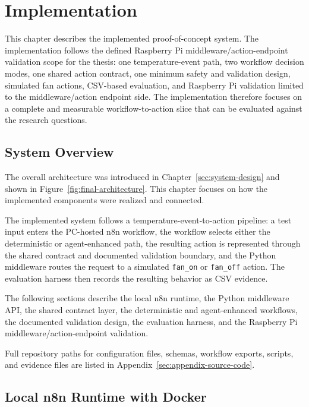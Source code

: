 \section{Implementation}\label{sec:implementation}




This chapter describes the implemented proof-of-concept system. The implementation follows the defined Raspberry Pi middleware/action-endpoint validation scope for the thesis: one temperature-event path, two workflow decision modes, one shared action contract, one minimum safety and validation design, simulated fan actions, CSV-based evaluation, and Raspberry Pi validation limited to the middleware/action endpoint side. The implementation therefore focuses on a complete and measurable workflow-to-action slice that can be evaluated against the research questions.




\subsection{System Overview}\label{subsec:implementation-system-overview}

The overall architecture was introduced in Chapter~\ref{sec:system-design} and shown in Figure~\ref{fig:final-architecture}. This chapter focuses on how the implemented components were realized and connected.

The implemented system follows a temperature-event-to-action pipeline: a test input enters the PC-hosted n8n workflow, the workflow selects either the deterministic or agent-enhanced path, the resulting action is represented through the shared contract and documented validation boundary, and the Python middleware routes the request to a simulated \texttt{fan\_on} or \texttt{fan\_off} action. The evaluation harness then records the resulting behavior as CSV evidence.

The following sections describe the local n8n runtime, the Python middleware API, the shared contract layer, the deterministic and agent-enhanced workflows, the documented validation design, the evaluation harness, and the Raspberry Pi middleware/action-endpoint validation.

Full repository paths for configuration files, schemas, workflow exports, scripts, and evidence files are listed in Appendix~\ref{sec:appendix-source-code}.

\subsection{Local n8n Runtime with Docker}\label{subsec:implementation-n8n-docker}

